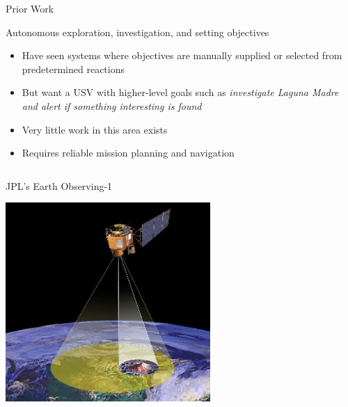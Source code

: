 \documentclass[9pt]{beamer}
\begin{document}
\begin{frame}{Prior Work}
    \begin{block}{Autonomous exploration, investigation, and setting objectives}
	    \begin{itemize}
	        \item Have seen systems where objectives are manually supplied or selected from predetermined reactions
    	    \item But want a USV with higher-level goals such as \textit{investigate Laguna Madre and alert if something interesting is found}
            \item Very little work in this area exists
	        \item Requires reliable mission planning and navigation
        \end{itemize}
    \end{block}
    \begin{columns}
        \begin{column}{0.50\textwidth}
            \begin{block}{JPL's Earth Observing-1}
                \begin{center}
                    \includegraphics[width=0.75\textwidth,trim={0cm 0cm 0cm 0cm},clip]{img/eo1.jpg}
                \end{center}
            \end{block}
        \end{column}
        \begin{column}{0.50\textwidth}
            \begin{block}{}
                \begin{itemize}

\end{itemize}
\end{block}
\end{column}
\end{columns}
\end{frame}
\end{document}
